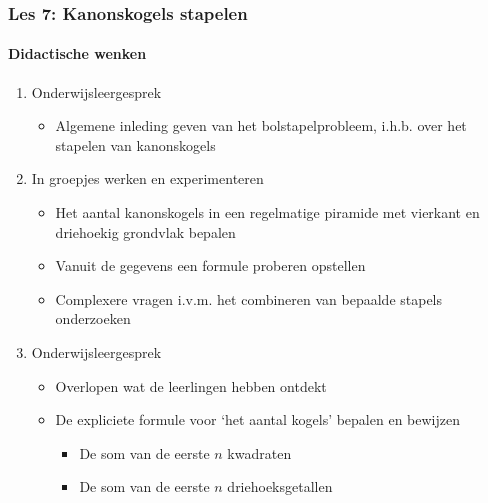 \documentclass[dutch]{beamer}
\begin{document}
\begin{frame}
\frametitle{Les 7: Kanonskogels stapelen}
\framesubtitle{Didactische wenken}
\begin{enumerate}
	\item Onderwijsleergesprek
	\begin{itemize}
	\item Algemene inleding geven van het bolstapelprobleem, i.h.b. over het stapelen van kanonskogels	
\end{itemize}
  \item In groepjes werken en experimenteren
  \begin{itemize}
	\item Het aantal kanonskogels in een regelmatige piramide met vierkant en driehoekig grondvlak bepalen
	\item Vanuit de gegevens een formule proberen opstellen
	\item Complexere vragen i.v.m. het combineren van bepaalde stapels onderzoeken
\end{itemize}
  \item Onderwijsleergesprek
  \begin{itemize}
	  \item Overlopen wat de leerlingen hebben ontdekt
	  \item De expliciete formule voor \textquoteleft het aantal kogels' bepalen en bewijzen
	  \begin{itemize}
	\item De som van de eerste $n$ kwadraten
	\item De som van de eerste $n$ driehoeksgetallen
\end{itemize}
  \end{itemize}
  
\end{enumerate}

\end{frame}

\end{document}
